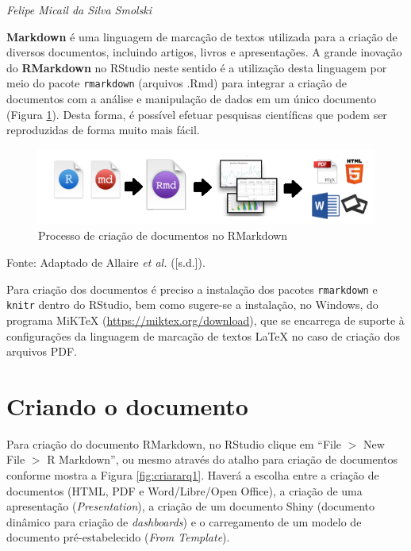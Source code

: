 \documentclass[12pt,brazil,oneside]{book}
\begin{document}
\emph{Felipe Micail da Silva Smolski}

\begin{flushright}
\emph{}
\end{flushright}

\textbf{Markdown} é uma linguagem de marcação de textos utilizada para a criação de diversos documentos, incluindo artigos, livros e apresentações. A grande inovação do \textbf{RMarkdown} no RStudio neste sentido é a utilização desta linguagem por meio do pacote \texttt{rmarkdown} (arquivos .Rmd) para integrar a criação de documentos com a análise e manipulação de dados em um único documento (Figura \ref{fig:rmark}). Desta forma, é possível efetuar pesquisas científicas que podem ser reproduzidas de forma muito mais fácil.

\begin{figure}[H]

{\centering \includegraphics[width=0.7\linewidth]{rmarkdown} 

}

\caption{Processo de criação de documentos no RMarkdown}\label{fig:rmark}
\end{figure}

Fonte: Adaptado de Allaire \emph{et al.} ({[}s.d.{]}).

Para criação dos documentos é preciso a instalação dos pacotes \texttt{rmarkdown} e \texttt{knitr} dentro do RStudio, bem como sugere-se a instalação, no Windows, do programa MiKTeX (\url{https://miktex.org/download}), que se encarrega de suporte à configurações da linguagem de marcação de textos LaTeX no caso de criação dos arquivos PDF.

\hypertarget{criando-o-documento}{%
\section{Criando o documento}\label{criando-o-documento}}

Para criação do documento RMarkdown, no RStudio clique em ``File \(>\) New File \(>\) R Markdown'', ou mesmo através do atalho para criação de documentos conforme mostra a Figura \ref{fig:criararq1}. Haverá a escolha entre a criação de documentos (HTML, PDF e Word/Libre/Open Office), a criação de uma apresentação (\emph{Presentation}), a criação de um documento Shiny (documento dinâmico para criação de \emph{dashboards}) e o carregamento de um modelo de documento pré-estabelecido (\emph{From Template}).
\end{document}
